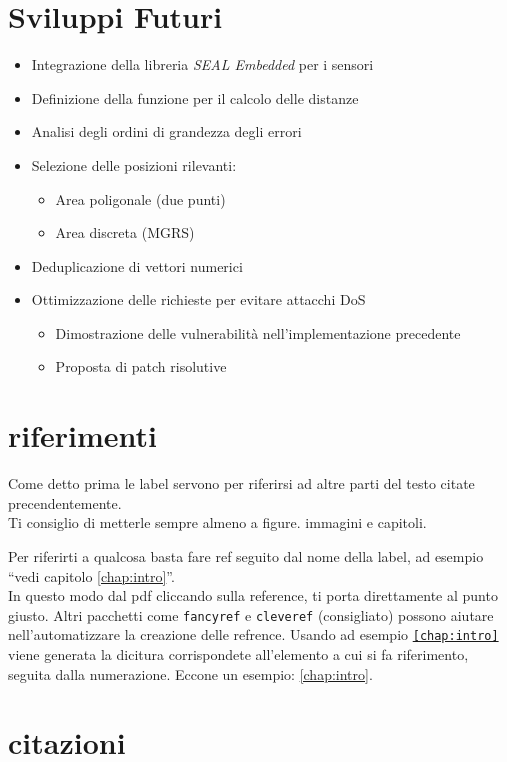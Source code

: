 \documentclass[12pt,a4paper,twoside]{book}
\begin{document}
\section{Sviluppi Futuri}
\begin{itemize}
    \item Integrazione della libreria \emph{SEAL Embedded} per i sensori
    \item Definizione della funzione per il calcolo delle distanze
    \item Analisi degli ordini di grandezza degli errori
    \item Selezione delle posizioni rilevanti:
    \begin{itemize}
        \item Area poligonale (due punti)
        \item Area discreta (MGRS)
    \end{itemize}
    \item Deduplicazione di vettori numerici
    \item Ottimizzazione delle richieste per evitare attacchi DoS
    \begin{itemize}
        \item Dimostrazione delle vulnerabilità nell'implementazione precedente
        \item Proposta di patch risolutive
    \end{itemize}
\end{itemize}


\section{riferimenti}
Come detto prima le label servono per riferirsi ad altre parti del testo citate precendentemente.\\
Ti consiglio di metterle sempre almeno a figure. immagini e capitoli.

Per riferirti a qualcosa basta fare ref seguito dal nome della label, ad esempio ``vedi capitolo \ref{chap:intro}''.\\In questo modo dal pdf cliccando sulla reference, ti porta direttamente al punto giusto.
Altri pacchetti come \texttt{fancyref} e \texttt{cleveref} (consigliato) possono aiutare nell'automatizzare la creazione delle refrence. Usando ad esempio \texttt{\cref{chap:intro}} viene generata la dicitura corrispondete all'elemento a cui si fa riferimento, seguita dalla numerazione. Eccone un esempio: \cref{chap:intro}.
\section{citazioni}
\end{document}
